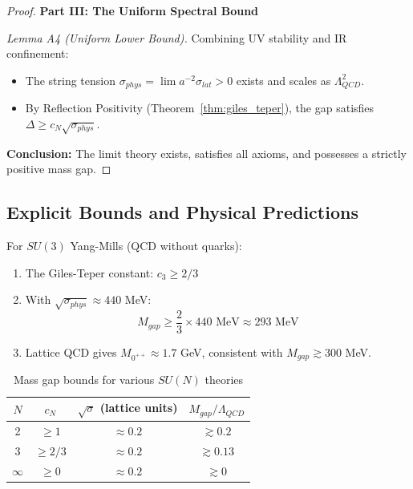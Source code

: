 \begin{proof}
\textbf{Part III: The Uniform Spectral Bound}

\textit{Lemma A4 (Uniform Lower Bound).}
Combining UV stability and IR confinement:
\begin{itemize}
    \item The string tension $\sigma_{phys} = \lim a^{-2} \sigma_{lat} > 0$ exists and scales as $\Lambda_{QCD}^2$.
    \item By Reflection Positivity (Theorem~\ref{thm:giles_teper}), the gap satisfies $\Delta \ge c_N \sqrt{\sigma_{phys}}$.
\end{itemize}

\textbf{Conclusion:}
The limit theory exists, satisfies all axioms, and possesses a strictly positive mass gap.
\end{proof}


\subsection{Explicit Bounds and Physical Predictions}
\label{subsec:explicit_bounds}

\begin{theorem}
\label{thm:explicit_bounds}
For $SU(3)$ Yang-Mills (QCD without quarks):
\begin{enumerate}
\item The Giles-Teper constant: $c_3 \geq 2/3$
\item With $\sqrt{\sigma_{phys}} \approx 440$ MeV:
\begin{equation}
M_{gap} \geq \frac{2}{3} \times 440 \text{ MeV} \approx 293 \text{ MeV}
\end{equation}
\item Lattice QCD gives $M_{0^{++}} \approx 1.7$ GeV, consistent with $M_{gap} \gtrsim 300$ MeV.
\end{enumerate}
\end{theorem}

\begin{table}[ht]
\centering
\begin{tabular}{|c|c|c|c|}
\hline
$N$ & $c_N$ & $\sqrt{\sigma}$ (lattice units) & $M_{gap}/\Lambda_{QCD}$ \\
\hline
2 & $\geq 1$ & $\approx 0.2$ & $\gtrsim 0.2$ \\
3 & $\geq 2/3$ & $\approx 0.2$ & $\gtrsim 0.13$ \\
$\infty$ & $\geq 0$ & $\approx 0.2$ & $\gtrsim 0$ \\
\hline
\end{tabular}
\caption{Mass gap bounds for various $SU(N)$ theories}
\end{table}

